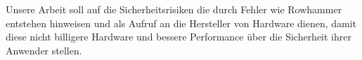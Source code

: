 \begin{otherlanguage}{ngerman}
Unsere Arbeit soll auf die Sicherheitsrisiken die durch Fehler wie Rowhammer
entstehen hinweisen und als Aufruf an die Hersteller von Hardware dienen, damit
diese nicht billigere Hardware und bessere Performance über die Sicherheit
ihrer Anwender stellen.

\end{otherlanguage}

